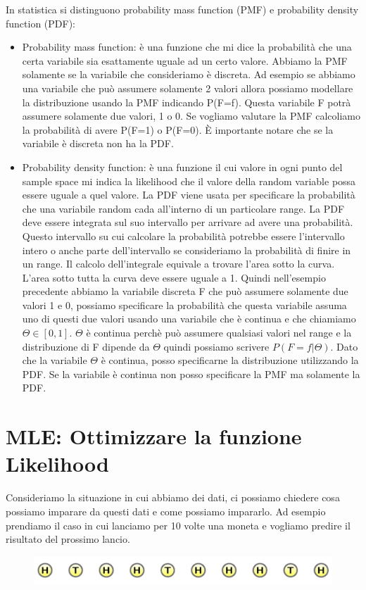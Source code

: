 \documentclass[14pt]{extreport}
\begin{document}
In statistica si distinguono probability mass function (PMF) e probability density function (PDF):
\begin{itemize}
\item Probability mass function: è una funzione che mi dice la probabilità che una certa variabile sia esattamente uguale ad un certo valore. Abbiamo
la PMF solamente se la variabile che consideriamo è discreta. Ad esempio se abbiamo una variabile che può assumere solamente 2 valori allora possiamo
modellare la distribuzione usando la PMF indicando P(F=f). Questa variabile F potrà assumere solamente due valori, 1 o 0. Se vogliamo valutare la PMF
calcoliamo la probabilità di avere P(F=1) o P(F=0). È importante notare che se la variabile è discreta non ha la PDF.
\item Probability density function: è una funzione il cui valore in ogni punto del sample space mi indica la likelihood che il valore della random
variable possa essere uguale a quel valore. La PDF viene usata per specificare la probabilità che una variabile random cada all'interno di un
particolare range. La PDF deve essere integrata sul suo intervallo per arrivare ad avere una probabilità. Questo intervallo su cui calcolare la
probabilità potrebbe essere l'intervallo intero o anche parte dell'intervallo se consideriamo la probabilità di finire in un range. Il calcolo
dell'integrale equivale a trovare l'area sotto la curva. L'area sotto tutta la curva deve essere uguale a 1. Quindi nell'esempio precedente abbiamo la
variabile discreta F che può assumere solamente due valori 1 e 0, possiamo specificare la probabilità che questa variabile assuma uno di questi due
valori usando una variabile che è continua e che chiamiamo $\Theta \in [0,1]$. $\Theta$ è continua perchè può assumere qualsiasi valori nel range e la
distribuzione di F dipende da $\Theta$ quindi possiamo scrivere $P(F=f | \Theta)$. Dato che la variabile $\Theta$ è continua, posso specificarne la
distribuzione utilizzando la PDF. Se la variabile è continua non posso specificare la PMF ma solamente la PDF.
\end{itemize} 

\section{MLE: Ottimizzare la funzione Likelihood}

Consideriamo la situazione in cui abbiamo dei dati, ci possiamo chiedere cosa possiamo imparare da questi dati e come possiamo impararlo. Ad esempio
prendiamo il caso in cui lanciamo per 10 volte una moneta e vogliamo predire il risultato del prossimo lancio.
\begin{figure}[H]
\centering
  \includegraphics[width=0.8\linewidth]{5.jpeg}
\end{figure}
\end{document}
